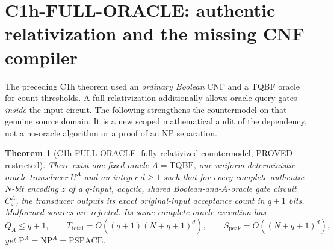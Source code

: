 \documentclass[11pt]{article}
\newtheorem{theorem}{Theorem}
\begin{document}
\section{C1h-FULL-ORACLE: authentic relativization and the missing CNF compiler}
The preceding C1h theorem used an \emph{ordinary Boolean} CNF and a
TQBF oracle for count thresholds. A full relativization additionally
allows oracle-query gates \emph{inside} the input circuit. The following
strengthens the countermodel on that genuine source domain. It is a
new scoped mathematical audit of the dependency, not a no-oracle
algorithm or a proof of an NP separation.

\begin{theorem}[C1h-FULL-ORACLE: fully relativized countermodel, PROVED restricted]
There exist one fixed oracle $A=\mathrm{TQBF}$, one uniform deterministic
oracle transducer $U^A$ and an integer $d\ge1$ such that for every
complete authentic $N$-bit encoding $z$ of a $q$-input, acyclic,
shared Boolean-and-$A$-oracle gate circuit $C_z^A$, the transducer
outputs its exact original-input acceptance count in $q+1$ bits.
Malformed sources are rejected. Its \emph{same complete oracle execution}
has
\[
 Q_A\le q+1,\qquad
 T_{\mathrm{total}}=O((q+1)(N+q+1)^d),\qquad
 S_{\mathrm{peak}}=O((N+q+1)^d),
\]
yet $\mathrm{P}^A=\mathrm{NP}^A=\mathrm{PSPACE}$.
\end{theorem}
\end{document}
